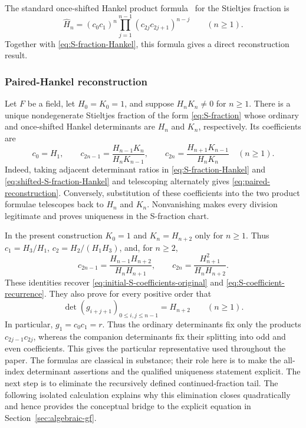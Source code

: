 \documentclass[11pt]{article}
\theoremstyle{remark}
\begin{document}
The standard once-shifted Hankel product formula~\cite{Krattenthaler2005} for the Stieltjes fraction is
\begin{equation}
 \widehat H_n=(c_0c_1)^n\prod_{j=1}^{n-1}(c_{2j}c_{2j+1})^{n-j}
 \qquad(n\geq1).
 \label{eq:shifted-S-fraction-Hankel}
\end{equation}
Together with \eqref{eq:S-fraction-Hankel}, this formula gives a direct
reconstruction result.

\subsubsection{Paired-Hankel reconstruction}
Let $F$ be a field, let $H_0=K_0=1$, and suppose $H_nK_n\ne0$ for
$n\geq1$.  There is a unique nondegenerate Stieltjes fraction of the form
\eqref{eq:S-fraction} whose ordinary and once-shifted Hankel determinants
are $H_n$ and $K_n$, respectively.  Its coefficients are
\begin{equation}
 c_0=H_1,\qquad
 c_{2n-1}=\frac{H_{n-1}K_n}{H_nK_{n-1}},\qquad
 c_{2n}=\frac{H_{n+1}K_{n-1}}{H_nK_n}\quad(n\geq1).
 \label{eq:paired-reconstruction}
\end{equation}
Indeed, taking adjacent determinant ratios in
\eqref{eq:S-fraction-Hankel} and
\eqref{eq:shifted-S-fraction-Hankel} and telescoping alternately gives
\eqref{eq:paired-reconstruction}.  Conversely, substitution of these
coefficients into the two product formulae telescopes back to $H_n$ and
$K_n$.  Nonvanishing makes every division legitimate and proves uniqueness
in the S-fraction chart.

In the present construction $K_0=1$ and $K_n=H_{n+2}$ only for $n\geq1$.
Thus $c_1=H_3/H_1$, $c_2=H_2/(H_1H_3)$, and, for $n\geq2$,
\begin{equation}
 c_{2n-1}=\frac{H_{n-1}H_{n+2}}{H_nH_{n+1}},\qquad
 c_{2n}=\frac{H_{n+1}^2}{H_nH_{n+2}}.
 \label{eq:paired-reconstruction-special}
\end{equation}
These identities recover \eqref{eq:initial-S-coefficients-original} and
\eqref{eq:S-coefficient-recurrence}.  They also prove for every positive
order that
\begin{equation}
 \det(g_{i+j+1})_{0\leq i,j\leq n-1}=H_{n+2}\qquad(n\geq1).
 \label{eq:literal-shifted-Hankel}
\end{equation}
In particular, $g_1=c_0c_1=r$.  Thus the ordinary determinants fix only the
products $c_{2j-1}c_{2j}$, whereas the companion determinants fix their
splitting into odd and even coefficients.  This gives the particular
representative used throughout the paper.  The formulas are classical in
substance; their role here is to make the all-index determinant assertions
and the qualified uniqueness statement explicit.  The next step is to eliminate the recursively defined continued-fraction
tail. The following isolated calculation explains why this elimination closes
quadratically and hence provides the conceptual bridge to the explicit equation
in Section~\ref{sec:algebraic-gf}.
\end{document}

